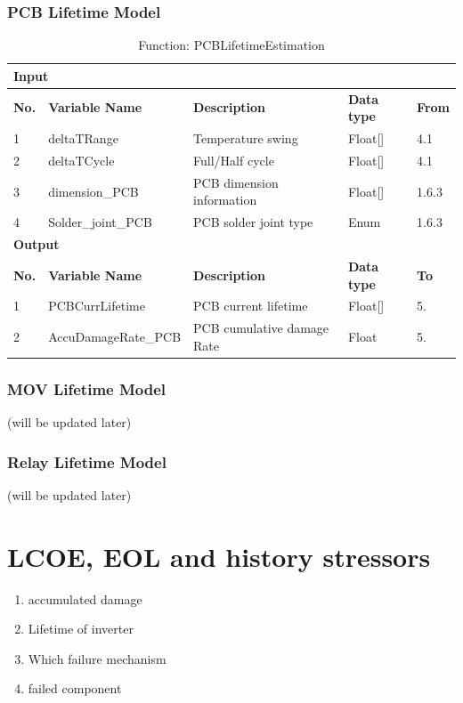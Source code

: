 \documentclass{article}
\begin{document}
\subsubsection{PCB Lifetime Model}
\begin{table}[h]
\centering
\caption{Function: PCBLifetimeEstimation}
\begin{tabular}{|l|l|l|l|l|}
\hline
\multicolumn{5}{|l|}{\textbf{Input}} \\ \hline
\textbf{No.} & \textbf{Variable Name} & \textbf{Description} & \textbf{Data type} & \textbf{From} \\ \hline
1 & deltaTRange & Temperature swing & Float[] & 4.1 \\ \hline
2 & deltaTCycle & Full/Half cycle & Float[] & 4.1 \\ \hline
3 & dimension\_PCB & PCB dimension information & Float[] & 1.6.3 \\ \hline
4 & Solder\_joint\_PCB & PCB solder joint type & Enum & 1.6.3 \\ \hline
\multicolumn{5}{|l|}{\textbf{Output}} \\ \hline
\textbf{No.} & \textbf{Variable Name} & \textbf{Description} & \textbf{Data type} & \textbf{To} \\ \hline
1 & PCBCurrLifetime & PCB current lifetime & Float[] & 5. \\ \hline
2 & AccuDamageRate\_PCB & PCB cumulative damage Rate & Float & 5. \\ \hline
\end{tabular}
\end{table}

\subsubsection{MOV Lifetime Model}
(will be updated later)

\subsubsection{Relay Lifetime Model}
(will be updated later)

\section{LCOE, EOL and history stressors}
\begin{enumerate}
    \item accumulated damage
    \item Lifetime of inverter
    \item Which failure mechanism
    \item failed component
\end{enumerate}
\end{document}
